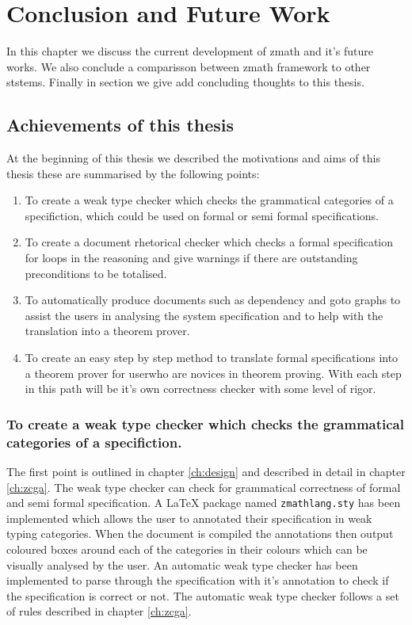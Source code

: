 \chapter{Conclusion and Future Work}
\label{ch:conclusion}

In this chapter we discuss the current development of \gls{zmath} and it's future works. We also conclude a comparisson between \gls{zmath} framework to other ststems. Finally in section we give add concluding thoughts to this thesis.


\section{Achievements of this thesis}

At the beginning of this thesis we described the motivations and aims of this thesis these are summarised by the following points:

\begin{enumerate}

\item To create a weak type checker which checks the grammatical categories of a specifiction, which could be used on formal or semi formal specifications.

\item To create a document rhetorical checker which checks a formal specification for loops in the reasoning and give warnings if there are outstanding preconditions to be totalised.

\item To automatically produce documents such as dependency and goto graphs to assist the users in analysing the system specification and to help with the translation into a theorem prover.

\item To create an easy step by step method to translate formal specifications into a theorem prover for userwho are novices in theorem proving. With each step in this path will be it's own correctness checker with some level of rigor.

\end{enumerate}

\subsection{To create a weak type checker which checks the grammatical categories of a specifiction.}

The first point is outlined in chapter \ref{ch:design} and described in detail in chapter \ref{ch:zcga}. The weak type checker can check for grammatical correctness of formal and semi formal specification. A \LaTeX{} package named \texttt{zmathlang.sty} has been implemented which allows the user to annotated their specification in weak typing categories. When the document is compiled the annotations then output coloured boxes around each of the categories in their colours which can be visually analysed by the user. An automatic weak type checker has been implemented to parse through the specification with it's annotation to check if the specification is correct or not. The automatic weak type checker follows a set of rules described in chapter \ref{ch:zcga}.

